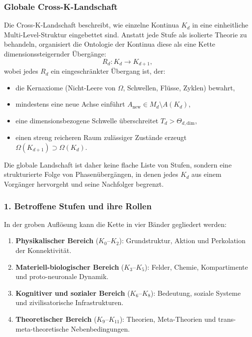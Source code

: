 
\subsubsection{Globale Cross-K-Landschaft}
\label{sec:crossk-global-landscape}

Die Cross-K-Landschaft beschreibt, wie einzelne Kontinua $K_d$ in eine
einheitliche Multi-Level-Struktur eingebettet sind. Anstatt jede Stufe als
isolierte Theorie zu behandeln, organisiert die Ontologie der Kontinua diese als
eine Kette dimensionssteigernder Übergänge:
\[
R_d : K_d \rightarrow K_{d+1},
\]
wobei jedes $R_d$ ein eingeschränkter Übergang ist, der:
\begin{itemize}
  \item die Kernaxiome (Nicht-Leere von $\Omega$, Schwellen, Flüsse, Zyklen)
        bewahrt,
  \item mindestens eine neue Achse einführt $A_{\text{new}} \in M_d \setminus A(K_d)$,
  \item eine dimensionsbezogene Schwelle überschreitet
        $T_d > \Theta_{d,\text{dim}}$,
  \item einen streng reicheren Raum zulässiger Zustände erzeugt
        $\Omega(K_{d+1}) \supset \Omega(K_d)$.
\end{itemize}

Die globale Landschaft ist daher keine flache Liste von Stufen, sondern eine
strukturierte Folge von Phasenübergängen, in denen jedes $K_d$ aus einem
Vorgänger hervorgeht und seine Nachfolger begrenzt.

\subsubsection{1. Betroffene Stufen und ihre Rollen}

In der groben Auflösung kann die Kette in vier Bänder gegliedert werden:
\begin{enumerate}
  \item \textbf{Physikalischer Bereich} ($K_0$--$K_2$): Grundstruktur, Aktion
        und Perkolation der Konnektivität.
  \item \textbf{Materiell-biologischer Bereich} ($K_3$--$K_5$):
        Felder, Chemie, Kompartimente und proto-neuronale Dynamik.
  \item \textbf{Kognitiver und sozialer Bereich} ($K_6$--$K_8$):
        Bedeutung, soziale Systeme und zivilisatorische Infrastrukturen.
  \item \textbf{Theoretischer Bereich} ($K_9$--$K_{11}$):
        Theorien, Meta-Theorien und trans-meta-theoretische Nebenbedingungen.
\end{enumerate}

